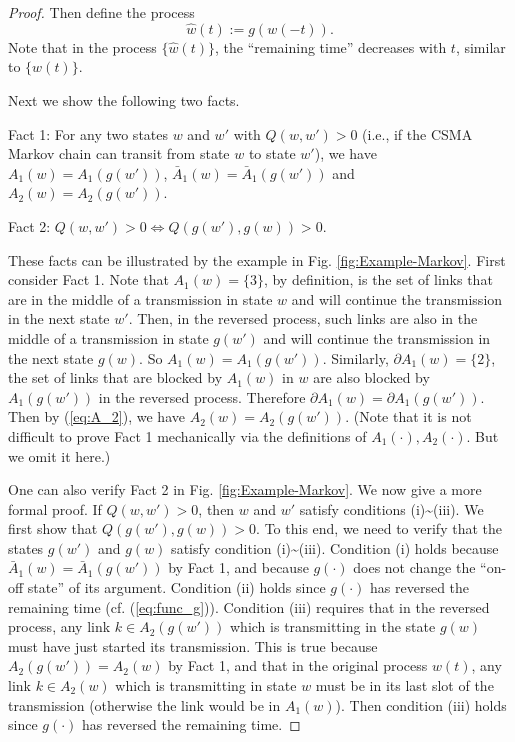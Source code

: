 \documentclass{IEEEtran}
\begin{document}
\begin{proof}
Then define the process \[
\hat{w}(t):=g(w(-t)).\]
Note that in the process $\{\hat{w}(t)\}$, the {}``remaining time''
decreases with $t$, similar to $\{w(t)\}$. 

Next we show the following two facts.

Fact 1: For any two states $w$ and $w'$ with $Q(w,w')>0$ (i.e.,
if the CSMA Markov chain can transit from state $w$ to state $w'$),
we have $A_{1}(w)=A_{1}(g(w'))$, $\bar{A}_{1}(w)=\bar{A}_{1}(g(w'))$
and $A_{2}(w)=A_{2}(g(w'))$. 

Fact 2: $Q(w,w')>0\Leftrightarrow Q(g(w'),g(w))>0$.

These facts can be illustrated by the example in Fig. \ref{fig:Example-Markov}.
First consider Fact 1. Note that $A_{1}(w)=\{3\}$, by definition,
is the set of links that are in the middle of a transmission in state
$w$ and will continue the transmission in the next state $w'$. Then,
in the reversed process, such links are also in the middle of a transmission
in state $g(w')$ and will continue the transmission in the next state
$g(w)$. So $A_{1}(w)=A_{1}(g(w'))$. Similarly, $\partial A_{1}(w)=\{2\}$,
the set of links that are blocked by $A_{1}(w)$ in $w$ are also
blocked by $A_{1}(g(w'))$ in the reversed process. Therefore $\partial A_{1}(w)=\partial A_{1}(g(w'))$.
Then by (\ref{eq:A_2}), we have $A_{2}(w)=A_{2}(g(w'))$. (Note that
it is not difficult to prove Fact 1 mechanically via the definitions
of $A_{1}(\cdot),A_{2}(\cdot)$. But we omit it here.) 

One can also verify Fact 2 in Fig. \ref{fig:Example-Markov}. We now
give a more formal proof. If $Q(w,w')>0$, then $w$ and $w'$ satisfy
conditions (i)\textasciitilde{}(iii). We first show that $Q(g(w'),g(w))>0$.
To this end, we need to verify that the states $g(w')$ and $g(w)$
satisfy condition (i)\textasciitilde{}(iii). Condition (i) holds because
$\bar{A}_{1}(w)=\bar{A}_{1}(g(w'))$ by Fact 1, and because $g(\cdot)$
does not change the {}``on-off state'' of its argument. Condition
(ii) holds since $g(\cdot)$ has reversed the remaining time (cf.
(\ref{eq:func_g})). Condition (iii) requires that in the reversed
process, any link $k\in A_{2}(g(w'))$ which is transmitting in the
state $g(w)$ must have just started its transmission. This is true
because $A_{2}(g(w'))=A_{2}(w)$ by Fact 1, and that in the original
process $w(t)$, any link $k\in A_{2}(w)$ which is transmitting in
state $w$ must be in its last slot of the transmission (otherwise
the link would be in $A_{1}(w)$). Then condition (iii) holds since
$g(\cdot)$ has reversed the remaining time.


\end{proof}
\end{document}
